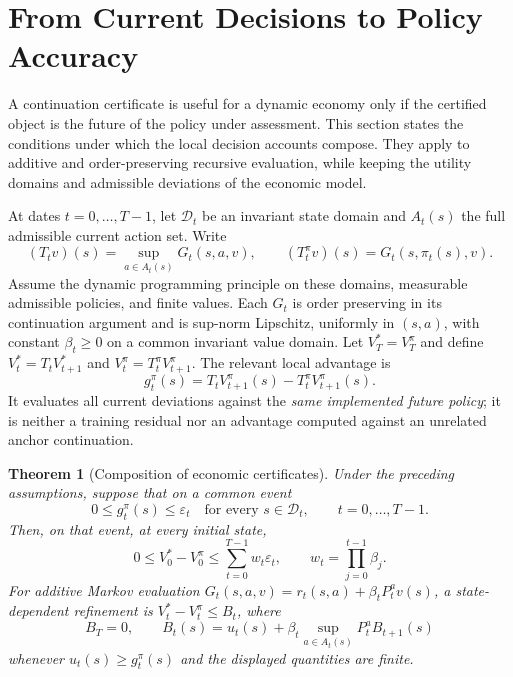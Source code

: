 \documentclass[ecta,nameyear,draft]{econsocart}
\newtheorem{theorem}{Theorem}
\theoremstyle{definition}
\theoremstyle{remark}
\begin{document}
\section{From Current Decisions to Policy Accuracy}\label{sec:r21composition}
A continuation certificate is useful for a dynamic economy only if the
certified object is the future of the policy under assessment. This section
states the conditions under which the local decision accounts compose.
They apply to additive and order-preserving recursive evaluation, while
keeping the utility domains and admissible deviations of the economic model.

At dates $t=0,\ldots,T-1$, let $\mathcal D_t$ be an invariant state domain
and $A_t(s)$ the full admissible current action set. Write
\[
 (T_t v)(s)=\sup_{a\in A_t(s)}G_t(s,a,v),\qquad
 (T_t^\pi v)(s)=G_t(s,\pi_t(s),v).
\]
Assume the dynamic programming principle on these domains, measurable
admissible policies, and finite values. Each $G_t$ is order preserving in its
continuation argument and is sup-norm Lipschitz, uniformly in $(s,a)$, with
constant $\beta_t\geq0$ on a common invariant value domain. Let
$V_T^*=V_T^\pi$ and define $V_t^*=T_tV_{t+1}^*$ and
$V_t^\pi=T_t^\pi V_{t+1}^\pi$. The relevant local advantage is
\begin{equation}
 g_t^\pi(s)=T_tV_{t+1}^\pi(s)-T_t^\pi V_{t+1}^\pi(s).
 \label{eq:r21advantage}
\end{equation}
It evaluates all current deviations against the \emph{same implemented
future policy}; it is neither a training residual nor an advantage computed
against an unrelated anchor continuation.

\begin{theorem}[Composition of economic certificates]\label{thm:r21composition}
Under the preceding assumptions, suppose that on a common event
\begin{equation}
 0\leq g_t^\pi(s)\leq\varepsilon_t
 \quad\text{for every }s\in\mathcal D_t,
 \qquad t=0,\ldots,T-1.
 \label{eq:r21uniform}
\end{equation}
Then, on that event, at every initial state,
\begin{equation}
 0\leq V_0^*-V_0^\pi\leq
 \sum_{t=0}^{T-1}w_t\varepsilon_t,
 \qquad w_t=\prod_{j=0}^{t-1}\beta_j.
 \label{eq:r21composition}
\end{equation}
For additive Markov evaluation
$G_t(s,a,v)=r_t(s,a)+\beta_tP_t^av(s)$, a state-dependent refinement is
$V_t^*-V_t^\pi\leq B_t$, where
\begin{equation}
 B_T=0,\qquad
 B_t(s)=u_t(s)+\beta_t\sup_{a\in A_t(s)}P_t^aB_{t+1}(s)
 \label{eq:r21envelope}
\end{equation}
whenever $u_t(s)\geq g_t^\pi(s)$ and the displayed quantities are finite.
\end{theorem}
\end{document}
